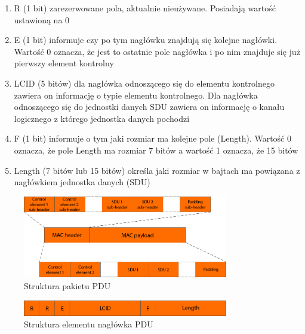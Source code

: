 \begin{enumerate}
	\item R (1 bit) zarezerwowane pola, aktualnie nieużywane. Posiadają wartość ustawioną na 0
	\item E (1 bit) informuje czy po tym nagłówku znajdują się kolejne nagłówki. Wartość 0 oznacza, że jest to ostatnie pole nagłówka i po nim znajduje się już pierwszy element kontrolny
	\item LCID (5 bitów) dla nagłówka odnoszącego się do elementu kontrolnego zawiera on informację o typie elementu kontrolnego. Dla nagłówka odnoszącego się do jednostki danych SDU zawiera on informację o kanału logicznego z którego jednostka danych pochodzi
	\item F (1 bit) informuje o tym jaki rozmiar ma kolejne pole (Length). Wartość 0 oznacza, że pole Length ma rozmiar 7 bitów a wartość 1 oznacza, że 15 bitów
	\item Length (7 bitów lub 15 bitów) określa jaki rozmiar w bajtach ma powiązana z nagłówkiem jednostka danych (SDU)
\end{enumerate}

\begin{figure}
	\centerline{\includegraphics[width=0.8\textwidth]{images/mac_pdu.png}}
	\caption{Struktura pakietu PDU}
	\label{fig:mac_pdu}
\end{figure}

\begin{figure}
	\centerline{\includegraphics[width=0.8\textwidth]{images/mac_pdu_subheader.png}}
	\caption{Struktura elementu nagłówka PDU}
	\label{fig:mac_pdu_subheader}
\end{figure}
